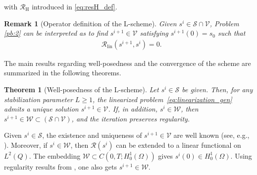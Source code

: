 \documentclass[review,11pt]{article}
\numberwithin{equation}{section}
\def \Om {\Omega}
\def \calV {\mathcal{V}}
\def \calR {\mathcal{R}}
\def \calS {\mathcal{S}}
\def \calW {\mathcal{W}}
\newtheorem{theorem}[theorem]{Theorem}
\newtheorem{remark}[remark]{Remark}
\newcommand\KM[1]{%
  \protect\leavevmode
  \begingroup
        \color{red!55!yellow}%
        #1%
  \endgroup
}
\begin{document}
with $\mathcal{R}_{\mathrm{H}}$ introduced in \eqref{eq:resH_def}.
\begin{remark}[Operator definition of the L-scheme] Given $s^i \in \mathcal{S}\cap\mathcal{V}$, Problem \ref{pb:2} can be interpreted as to find $s^{i+1} \in \mathcal{V}$ satisfying $s^{i+1}(0)=s_0$ such that
\begin{align}
&\mathcal{R}_{\mathrm{lin}}(s^{i+1},s^i)= 0.
\label{eq:l_b}
\end{align}
\end{remark}

The main results regarding well-posedness and the convergence of the scheme are summarized in the following theorems.
\begin{theorem}[Well-posedness of the L-scheme]
\label{Convergence_theorem}
Let $s^i \in \mathcal{S}$ be given. Then, for any stabilization parameter $L\geq1$, 
the linearized problem~\eqref{eq:linearization_gen} admits a unique solution $s^{i+1} \in \mathcal{V}$. 
If, in addition, $s^i \in \mathcal{W}$, then $s^{i+1} \in \mathcal{W}\subset (\calS\cap \calV)$, and the iteration preserves regularity.
\end{theorem}
\noindent
Given $s^i \in \mathcal{S}$, the existence and uniqueness of $s^{i+1} \in \mathcal{V}$ are well known (see, e.g., \cite[Chapter~7]{evans2022partial}). Moreover, if $s^i\in \calW$, then $\calR(s^i)$ can be extended to a linear functional on $L^2(Q)$. The embedding $\calW\subset C(0,T;H^1_0(\Om))$ gives $s^i(0)\in H^1_0(\Om)$. Using regularity results from \cite[Chapter 7]{evans2022partial}, one also gets $s^{i+1}\in \calW$. 


\end{document}
